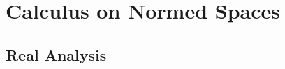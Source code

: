 \documentclass[crop=false,class=article,oneside]{standalone}
\begin{document}
    \ifx\ifworkmasterswork\undefined
        \section*{Calculus on Normed Spaces}
        \setcounter{section}{1}
    \fi
    \subsection{Real Analysis}
\end{document}
